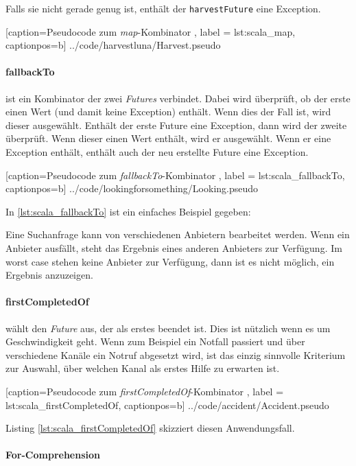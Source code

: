 Falls sie nicht gerade genug ist, enthält der \texttt{harvestFuture}
eine Exception.


    [caption={Pseudocode zum \emph{map}-Kombinator },
       label = lst:scala_map,
       captionpos=b]
 {../code/harvestluna/Harvest.pseudo}
 
\paragraph{fallbackTo} ist ein Kombinator der zwei \emph{Futures}
verbindet. Dabei wird überprüft, ob der erste einen Wert (und damit
keine Exception) enthält. Wenn dies der Fall ist, wird dieser ausgewählt.
Enthält der erste Future eine Exception, dann wird der zweite überprüft.
Wenn dieser einen Wert enthält, wird er ausgewählt. Wenn er eine
Exception enthält, enthält auch der neu erstellte Future eine Exception.


    [caption={Pseudocode zum \emph{fallbackTo}-Kombinator },
       label = lst:scala_fallbackTo,
       captionpos=b]
 {../code/lookingforsomething/Looking.pseudo}
 
In \ref{lst:scala_fallbackTo} ist ein einfaches Beispiel gegeben:

Eine Suchanfrage kann von verschiedenen Anbietern bearbeitet werden. 
Wenn ein Anbieter ausfällt, steht das Ergebnis eines anderen Anbieters 
zur Verfügung. Im worst case stehen keine Anbieter zur Verfügung, 
dann ist es nicht möglich, ein Ergebnis anzuzeigen.

\paragraph{firstCompletedOf} wählt den \emph{Future} aus, der als
erstes beendet ist. Dies ist nützlich wenn es um Geschwindigkeit
geht. Wenn zum Beispiel ein Notfall passiert und über verschiedene
Kanäle ein Notruf abgesetzt wird, ist das einzig sinnvolle Kriterium
zur Auswahl, über welchen Kanal als erstes Hilfe zu erwarten ist.


    [caption={Pseudocode zum \emph{firstCompletedOf}-Kombinator },
       label = lst:scala_firstCompletedOf,
       captionpos=b]
 {../code/accident/Accident.pseudo}
 
Listing \ref{lst:scala_firstCompletedOf} skizziert diesen
Anwendungsfall.

\paragraph{For-Comprehension}
